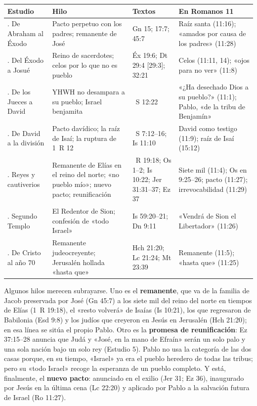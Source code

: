\documentclass[11pt,letterpaper]{article}
\begin{document}
\begin{center}\footnotesize
\renewcommand{\arraystretch}{1.3}
\begin{tabular}{>{\RaggedRight\arraybackslash}p{2.9cm}>{\RaggedRight\arraybackslash}p{4.4cm}>{\RaggedRight\arraybackslash}p{2.5cm}>{\RaggedRight\arraybackslash}p{4.2cm}}
\toprule
\textbf{Estudio} & \textbf{Hilo} & \textbf{Textos} & \textbf{En Romanos 11}\\
\midrule
1. De Abraham al Éxodo & Pacto perpetuo con los padres; remanente de José & Gn 15; 17:7; 45:7 & Raíz santa (11:16); «amados por causa de los padres» (11:28)\\
2. Del Éxodo a Josué & Reino de sacerdotes; celos por lo que no es pueblo & Éx 19:6; Dt 29:4 [29:3]; 32:21 & Celos (11:11, 14); «ojos para no ver» (11:8)\\
3. De los Jueces a David & YHWH no desampara a su pueblo; Israel benjamita & 1~S 12:22 & «¿Ha desechado Dios a su pueblo?» (11:1); Pablo, «de la tribu de Benjamín»\\
4. De David a la división & Pacto davídico; la raíz de Isaí; la ruptura de 1~R 12 & 2~S 7:12--16; Is 11:10 & David como testigo (11:9); raíz de Isaí (15:12)\\
5. Reyes y cautiverios & Remanente de Elías en el reino del norte; «no pueblo mío»; nuevo pacto; reunificación & 1~R 19:18; Os 1--2; Is 10:22; Jer 31:31--37; Ez 37 & Siete mil (11:4); Os en 9:25--26; pacto (11:27); irrevocabilidad (11:29)\\
6. Segundo Templo & El Redentor de Sion; confesión de «todo Israel» & Is 59:20--21; Dn 9:11 & «Vendrá de Sion el Libertador» (11:26)\\
7. De Cristo al año 70 & Remanente judeocreyente; Jerusalén hollada «hasta que» & Hch 21:20; Lc 21:24; Mt 23:39 & Remanente (11:5); «hasta que» (11:25)\\
\bottomrule
\end{tabular}\end{center}

Algunos hilos merecen subrayarse. Uno es el \textbf{remanente}, que va de la familia de Jacob preservada por José (Gn 45:7) a los siete mil del reino del norte en tiempos de Elías (1~R 19:18), el «resto volverá» de Isaías (Is 10:21), los que regresaron de Babilonia (Esd 9:8) y los judíos que creyeron en Jesús en Jerusalén (Hch 21:20); en esa línea se sitúa el propio Pablo. Otro es la \textbf{promesa de reunificación}: Ez 37:15--28 anuncia que Judá y «José, en la mano de Efraín» serán un solo palo y una sola nación bajo un solo rey (Estudio 5). Pablo no usa la categoría de las dos casas porque, en su tiempo, «Israel» ya era el pueblo heredero de todas las tribus; pero su «todo Israel» recoge la esperanza de un pueblo completo. Y está, finalmente, el \textbf{nuevo pacto}: anunciado en el exilio (Jer 31; Ez 36), inaugurado por Jesús en la última cena (Lc 22:20) y aplicado por Pablo a la salvación futura de Israel (Ro 11:27).
\end{document}
